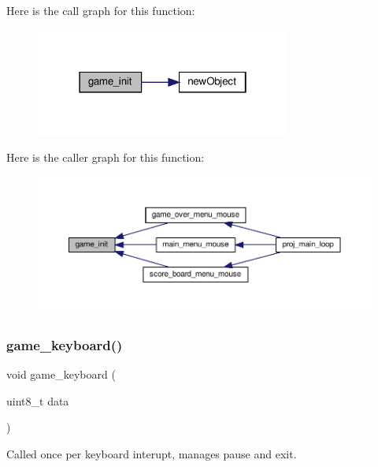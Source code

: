 Here is the call graph for this function\+:\nopagebreak
\begin{figure}[H]
\begin{center}
\leavevmode
\includegraphics[width=238pt]{group__Game_ga5f5ccbe5abfdef24c8378dc3cf32ffb3_cgraph}
\end{center}
\end{figure}
Here is the caller graph for this function\+:\nopagebreak
\begin{figure}[H]
\begin{center}
\leavevmode
\includegraphics[width=350pt]{group__Game_ga5f5ccbe5abfdef24c8378dc3cf32ffb3_icgraph}
\end{center}
\end{figure}
\mbox{\label{group__Game_ga51812b928d0d9e7b80bc06c044e7f5ce}} 
\subsubsection{\texorpdfstring{game\+\_\+keyboard()}{game\_keyboard()}}
{\footnotesize\ttfamily void game\+\_\+keyboard (\begin{DoxyParamCaption}\item[{uint8\+\_\+t}]{data }\end{DoxyParamCaption})}



Called once per keyboard interupt, manages pause and exit. 

